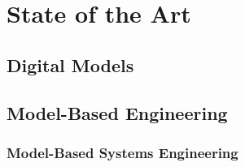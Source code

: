 \chapter{State of the Art}
\label{sec:state-of-the-art}

\section{Digital Models}
\label{sec:digital-models}
\autocite{hinsen_computational_2014}
\autocite{hinsen_scientific_2016}
\autocite{sussman_role_2002}

\section{Model-Based Engineering}
\label{sec:model-based-engineering}

\subsection{Model-Based Systems Engineering}
\label{sec:model-based-systems-engineering}
